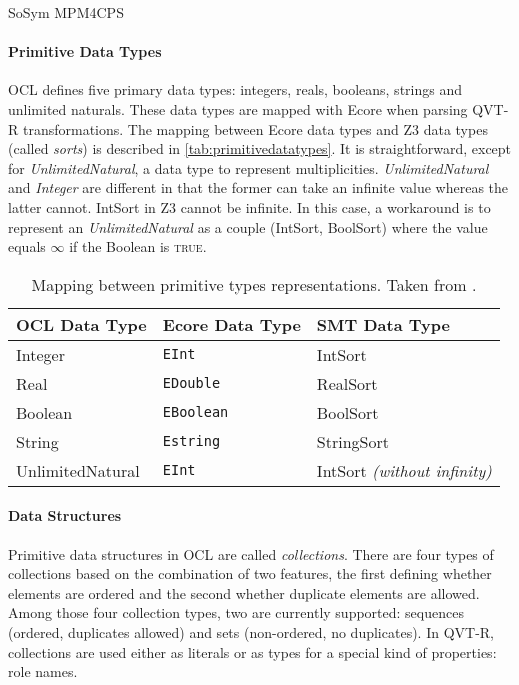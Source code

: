 \begin{copiedFrom}{SoSym MPM4CPS}
\paragraph{Primitive Data Types}

OCL defines five primary data types: integers, reals, booleans, strings and unlimited naturals. These data types are mapped with Ecore when parsing QVT-R transformations. The mapping between Ecore data types and Z3 data types (called \textit{sorts}) is described in \autoref{tab:primitivedatatypes}. It is straightforward, except for \textit{UnlimitedNatural}, a data type to represent multiplicities. \textit{UnlimitedNatural} and \textit{Integer} are different in that the former can take an infinite value whereas the latter cannot. IntSort in Z3 cannot be infinite. In this case, a workaround is to represent an \textit{UnlimitedNatural} as a couple (IntSort, BoolSort) where the value equals $\infty$ if the Boolean is \textsc{true}. %

\begin{table}
\small
\centering
\renewcommand{\arraystretch}{1.2}%
\setlength\tabcolsep{2 pt}
\begin{tabular}{L{2.6cm} L{2.6cm} L{3.0cm}}
\toprule
\textbf{OCL Data Type} & \textbf{Ecore Data Type} & \textbf{SMT Data Type} \\
\midrule
    Integer & \texttt{EInt} & IntSort \\
    Real    & \texttt{EDouble} & RealSort \\
    Boolean & \texttt{EBoolean} & BoolSort \\
    String  & \texttt{Estring} & StringSort \\
    UnlimitedNatural & \texttt{EInt} & IntSort \textit{(without infinity)}\\
\bottomrule
\end{tabular}
\caption[Mapping between primitive type representations]{Mapping between primitive types representations. Taken from .} %
\label{tab:primitivedatatypes}
\end{table}

\paragraph{Data Structures}
Primitive data structures in OCL are called \textit{collections}. There are four types of collections based on the combination of two features, the first defining whether elements are ordered and the second whether duplicate elements are allowed. Among those four collection types, two are currently supported: sequences (ordered, duplicates allowed) and sets (non-ordered, no duplicates). In QVT-R, collections are used either as literals or as types for a special kind of properties: role names.


\end{copiedFrom}
